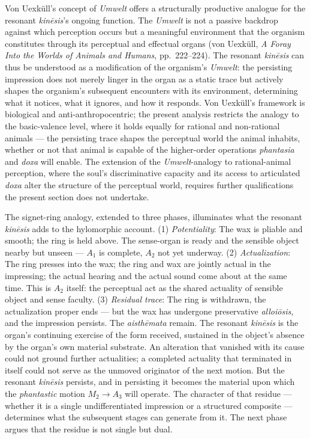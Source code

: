 Von Uexküll's concept of \textit{Umwelt} offers a structurally productive analogue for the resonant \textit{kinēsis}'s ongoing function. The \textit{Umwelt} is not a passive backdrop against which perception occurs but a meaningful environment that the organism constitutes through its perceptual and effectual organs (von Uexküll, \textit{A Foray Into the Worlds of Animals and Humans}, pp.~222--224). The resonant \textit{kinēsis} can thus be understood as a modification of the organism's \textit{Umwelt}: the persisting impression does not merely linger in the organ as a static trace but actively shapes the organism's subsequent encounters with its environment, determining what it notices, what it ignores, and how it responds. Von Uexküll's framework is biological and anti-anthropocentric; the present analysis restricts the analogy to the basic-valence level, where it holds equally for rational and non-rational animals --- the persisting trace shapes the perceptual world the animal inhabits, whether or not that animal is capable of the higher-order operations \textit{phantasia} and \textit{doxa} will enable. The extension of the \textit{Umwelt}-analogy to rational-animal perception, where the soul's discriminative capacity and its access to articulated \textit{doxa} alter the structure of the perceptual world, requires further qualifications the present section does not undertake.

The signet-ring analogy, extended to three phases, illuminates what the resonant \textit{kinēsis} adds to the hylomorphic account. (1) \textit{Potentiality}: The wax is pliable and smooth; the ring is held above. The sense-organ is ready and the sensible object nearby but unseen --- $A_1$ is complete, $A_2$ not yet underway. (2) \textit{Actualization}: The ring presses into the wax; the ring and wax are jointly actual in the impressing; the actual hearing and the actual sound come about at the same time. This is $A_2$ itself: the perceptual act as the shared actuality of sensible object and sense faculty. (3) \textit{Residual trace}: The ring is withdrawn, the actualization proper ends --- but the wax has undergone preservative \textit{alloiōsis}, and the impression persists. The \textit{aisthēmata} remain. The resonant \textit{kinēsis} is the organ's continuing exercise of the form received, sustained in the object's absence by the organ's own material substrate. An alteration that vanished with its cause could not ground further actualities; a completed actuality that terminated in itself could not serve as the unmoved originator of the next motion. But the resonant \textit{kinēsis} persists, and in persisting it becomes the material upon which the \textit{phantastic} motion $M_2 \rightarrow A_3$ will operate. The character of that residue --- whether it is a single undifferentiated impression or a structured composite --- determines what the subsequent stages can generate from it. The next phase argues that the residue is not single but dual.


